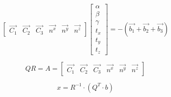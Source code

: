 \documentclass[12pt, a4paper]{article}
\begin{document}
$$\begin{bmatrix}
    \vec{C_1} &
    \vec{C_2} &
    \vec{C_3} & 
    \vec{n^x} &
    \vec{n^y} &
    \vec{n^z}
\end{bmatrix}
\begin{bmatrix}
    \alpha \\
    \beta \\
    \gamma \\
    t_x \\
    t_y \\
    t_z
\end{bmatrix}
=
-(\vec{b_1} + \vec{b_2} + \vec{b_3})
$$


$$
QR = A = \begin{bmatrix}
    \vec{C_1} &
    \vec{C_2} &
    \vec{C_3} & 
    \vec{n^x} &
    \vec{n^y} &
    \vec{n^z}
\end{bmatrix}
$$

$$x = R^{-1} \cdot (Q^{T} \cdot b)$$
\end{document}
